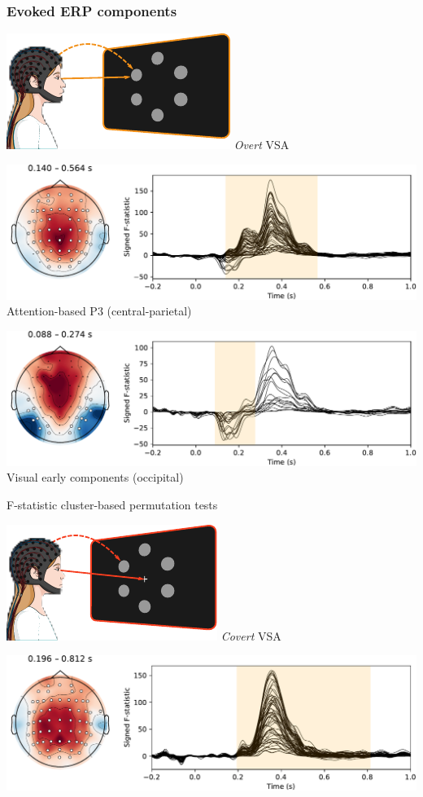 \documentclass{kul-ulille-beamer}
\begin{document}
\begin{frame}
  \frametitle{Evoked ERP components}
  \footnotesize
  \begin{minipage}[t]{.45\textwidth}
    \includegraphics[width=.2\textwidth]{figures/covert/attention_overt.pdf}
    \hspace{.5em}
    \emph{Overt} VSA
    \smallskip

    \includegraphics[width=\textwidth]{figures/covert/erps/erp_overt_cluster-1.pdf}
    Attention-based P3 (central-parietal)
    \bigskip

    \includegraphics[width=\textwidth]{figures/covert/erps/erp_overt_cluster-0.pdf}
    Visual early components (occipital)
    \smallskip

    F-statistic cluster-based permutation tests
  \end{minipage}\hfill%
  \begin{minipage}[t]{.45\textwidth}
    \includegraphics[width=.2\textwidth]{figures/covert/attention_covert.pdf}
    \hspace{.5em}
    \emph{Covert} VSA
    \smallskip

    \includegraphics[width=\textwidth]{figures/covert/erps/erp_covert_cluster-0.pdf}
    \smallskip


\end{minipage}
\end{frame}
\end{document}
